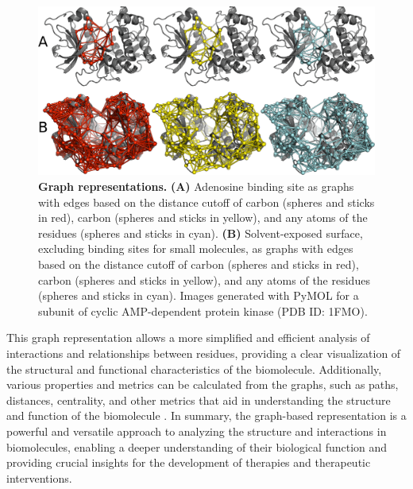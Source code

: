 \documentclass[Ingles]{phdthesis}
\begin{document}
\begin{figure}[ht]
\centerline{\includegraphics[scale=1.9]{images/graph-representation.png}}
\caption[Graph representations]{\textbf{Graph representations.} \textbf{(A)} Adenosine binding site as graphs with edges based on the distance cutoff of carbon \textalpha\space (spheres and sticks in red), carbon \textbeta\space (spheres and sticks in yellow), and any atoms of the residues (spheres and sticks in cyan). \textbf{(B)} Solvent-exposed surface, excluding binding sites for small molecules, as graphs with edges based on the distance cutoff of carbon \textalpha\space (spheres and sticks in red), carbon \textbeta\space (spheres and sticks in yellow), and any atoms of the residues (spheres and sticks in cyan). Images generated with PyMOL for a subunit of cyclic AMP-dependent protein kinase (PDB ID: 1FMO).}
\label{fig:graph-representation}
\end{figure}

This graph representation allows a more simplified and efficient analysis of interactions and relationships between residues, providing a clear visualization of the structural and functional characteristics of the biomolecule. Additionally, various properties and metrics can be calculated from the graphs, such as paths, distances, centrality, and other metrics that aid in understanding the structure and function of the biomolecule \cite{majeed2020,vishveshwara2002,mason2007}. In summary, the graph-based representation is a powerful and versatile approach to analyzing the structure and interactions in biomolecules, enabling a deeper understanding of their biological function and providing crucial insights for the development of therapies and therapeutic interventions.


\end{document}
